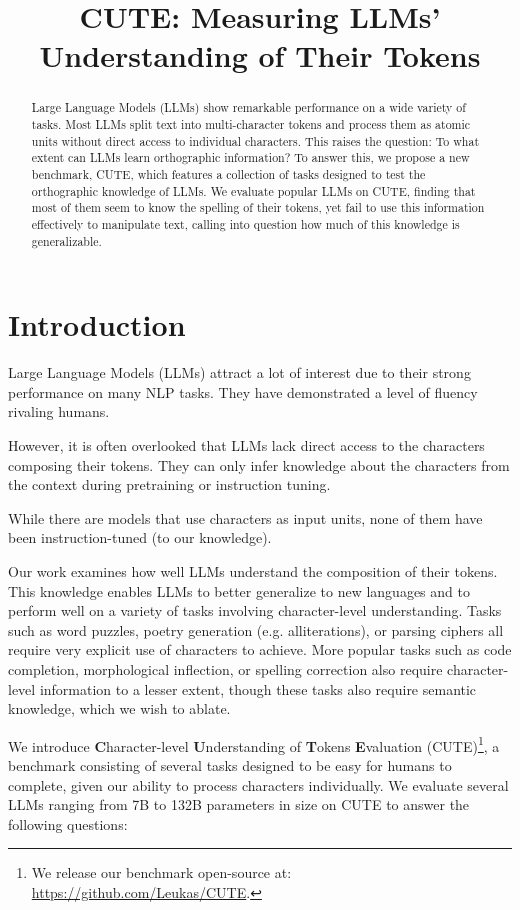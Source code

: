 \title{CUTE: Measuring LLMs' Understanding of Their Tokens}

\begin{abstract}
Large Language Models (LLMs) show remarkable performance on a wide variety of tasks. Most LLMs split text into multi-character tokens and process them as atomic units without direct access to individual characters. This raises the question: To what extent can LLMs learn orthographic information?  To answer this, we propose a new benchmark, CUTE, which features a collection of tasks designed to test the orthographic knowledge of LLMs. We evaluate popular LLMs on CUTE, finding that most of them seem to know the spelling of their tokens, yet fail to use this information effectively to manipulate text, calling into question how much of this knowledge is generalizable.
\end{abstract}

\section{Introduction}

Large Language Models (LLMs) attract a lot of interest due to their strong performance on many NLP tasks. They have demonstrated a level of fluency rivaling humans.

However, it is often overlooked that LLMs lack direct access to the characters composing their tokens. They can only infer knowledge about the characters from the context during pretraining or instruction tuning.

While there are models that use characters as input units, none of them have been instruction-tuned (to our knowledge).

Our work examines how well LLMs understand the composition of their tokens. This knowledge enables LLMs to better generalize to new languages and to perform well on a variety of tasks involving character-level understanding. Tasks such as word puzzles, poetry generation (e.g. alliterations), or parsing ciphers all require very explicit use of characters to achieve. More popular tasks such as code completion, morphological inflection, or spelling correction also require character-level information to a lesser extent, though these tasks also require semantic knowledge, which we wish to ablate.

We introduce \textbf{C}haracter-level \textbf{U}nderstanding of \textbf{T}okens \textbf{E}valuation (CUTE)\footnote{We release our benchmark open-source at: \url{https://github.com/Leukas/CUTE}.}, a benchmark consisting of several tasks designed to be easy for humans to complete, given our ability to process characters individually. We evaluate several LLMs ranging from 7B to 132B parameters in size on CUTE to answer the following questions:

